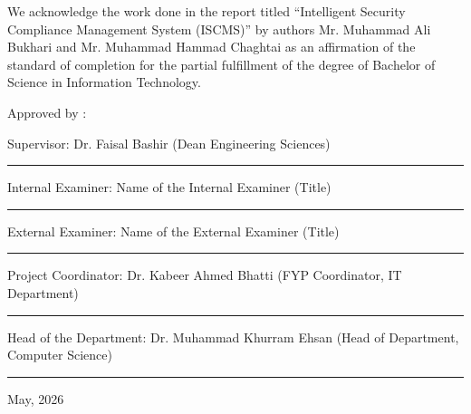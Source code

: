 \documentclass[11pt,a4paper,oneside,openright]{report}
\begin{document}
\begin{singlespace}
We acknowledge the work done in the report titled ``Intelligent Security Compliance Management System (ISCMS)'' by authors Mr. Muhammad Ali Bukhari and Mr. Muhammad Hammad Chaghtai as an affirmation of the standard of completion for the partial fulfillment of the degree of Bachelor of Science in Information Technology.

\vspace{8mm}

\noindent Approved by :

\vskip 6mm

\noindent Supervisor: Dr. Faisal Bashir (Dean Engineering Sciences)
\par\vskip 2mm
\hfill \rule{0.75\linewidth}{0.2mm}

\vskip 6mm

\noindent Internal Examiner: Name of the Internal Examiner (Title)
\par\vskip 2mm
\hfill \rule{0.75\linewidth}{0.2mm}

\vskip 6mm

\noindent External Examiner: Name of the External Examiner (Title)
\par\vskip 2mm
\hfill \rule{0.75\linewidth}{0.2mm}

\vskip 6mm

\noindent Project Coordinator: Dr. Kabeer Ahmed Bhatti (FYP Coordinator, IT Department)
\par\vskip 2mm
\hfill \rule{0.75\linewidth}{0.2mm}

\vskip 6mm

\noindent Head of the Department: Dr. Muhammad Khurram Ehsan (Head of Department, \\ Computer Science)
\par\vskip 2mm
\hfill \rule{0.75\linewidth}{0.2mm}

\vspace{10mm}

\noindent May, 2026
\end{singlespace}


\newpage
{}
{}
\end{document}
